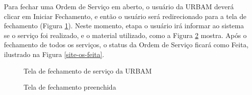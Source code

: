 \documentclass[
	article,			%
	11pt,				%
	oneside,			%
	a4paper,			%
	english,			%
	brazil,				%
	sumario=tradicional
	]{abntex2}
\begin{document}
Para fechar uma Ordem de Serviço em aberto, o usuário da URBAM deverá clicar em Iniciar Fechamento, e então o usuário será redirecionado para a tela de fechamento (Figura \ref{site-fechamento-urbam}).
Neste momento, etapa o usuário irá informar ao sistema se o serviço foi realizado, e o material utilizado, como a Figura \ref{site-material-e-motivo} mostra.
Após o fechamento de todos os serviços, o status da Ordem de Serviço ficará como Feita, ilustrado na Figura \ref{site-os-feita}.

\begin{figure}[!htbp]
 \centering
 \caption{\label{site-fechamento-urbam}Tela de fechamento de serviço da URBAM}
\end{figure}

\begin{figure}[!htbp]
 \centering
 \caption{\label{site-material-e-motivo}Tela de fechamento preenchida}
\end{figure}
\end{document}
